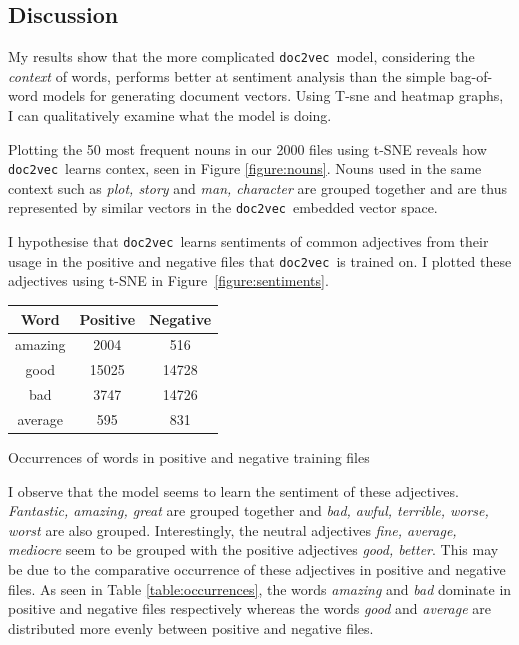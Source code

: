 \documentclass[12pt]{article}
\newcommand{\docvec}{\texttt{doc2vec}}
\begin{document}
\begin{multicols}{2}
\section{Discussion}

My results show that the more complicated \docvec~model, considering the \emph{context} of words, performs better at sentiment analysis than the simple bag-of-word models for generating document vectors. Using T-sne and heatmap graphs, I can qualitatively examine what the model is doing.

Plotting the 50 most frequent nouns in our 2000 files using t-SNE reveals how \docvec~learns contex, seen in Figure \ref{figure:nouns}. Nouns used in the same context such as \emph{plot, story} and \emph{man, character} are grouped together and are thus represented by similar vectors in the \docvec~embedded vector space.

I hypothesise that \docvec~learns sentiments of common adjectives from their usage in the positive and negative files that \docvec~is trained on. I plotted these adjectives using t-SNE in Figure~\ref{figure:sentiments}.

\begin{tablehere}
\centering
 \begin{tabular}{| c | c | c|}  
 \hline
Word & Positive & Negative \\ [0.5ex] 
 \hline\hline
 amazing & 2004 & 516 \\
 \hline
 good & 15025 & 14728 \\ 
 \hline
bad & 3747 & 14726 \\
 \hline
average & 595 & 831 \\
 \hline
\end{tabular}
\caption{Occurrences of words in positive and negative training files} \label{table:occurrences}
\end{tablehere}

I observe that the model seems to learn the sentiment of these adjectives. \emph{Fantastic, amazing, great} are grouped together and \emph{bad, awful, terrible, worse, worst} are also grouped. Interestingly, the neutral adjectives \emph{fine, average, mediocre} seem to be grouped with the positive adjectives \emph{good, better}. This may be due to the comparative occurrence of these adjectives in positive and negative files. As seen in Table \ref{table:occurrences}, the words \emph{amazing} and \emph{bad} dominate in positive and negative files respectively whereas the words \emph{good} and \emph{average} are distributed more evenly between positive and negative files.


\end{multicols}
\end{document}
